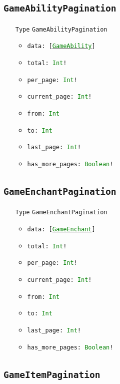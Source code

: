 \documentclass[10pt, a4paper]{memoir}
\numberwithin{equation}{section}
\theoremstyle{plain}
\theoremstyle{defp}
\theoremstyle{dotless}
\theoremstyle{definition}
\theoremstyle{dotless}
\theoremstyle{dotless}
\theoremstyle{defp}
\theoremstyle{defp}
\theoremstyle{be}          %
\theoremstyle{defp}
\newcommand\ttt[1]{\texttt{#1}}
\newcommand\type[1]{\ttt{\textcolor{green}{#1}}}
\begin{document}
\subsection{\ttt{GameAbilityPagination}}\label{sec:gameabilitypagination}

\begin{itemize}[noitemsep,topsep=1pt]
\item[\ttt{Type}] \ttt{GameAbilityPagination}
\begin{itemize}[itemsep=1pt,topsep=1pt]
\item \ttt{data: [\hyperref[sec:GameAbility]{\type{GameAbility}}]}
\item \ttt{total: \type{Int}!}
\item \ttt{per\_page: \type{Int}!}
\item \ttt{current\_page: \type{Int}!}
\item \ttt{from: \type{Int}}
\item \ttt{to: \type{Int}}
\item \ttt{last\_page: \type{Int}!}
\item \ttt{has\_more\_pages: \type{Boolean}!}
\end{itemize}
\end{itemize}

\subsection{\ttt{GameEnchantPagination}}\label{sec:gameenchantpagination}

\begin{itemize}[noitemsep,topsep=1pt]
\item[\ttt{Type}] \ttt{GameEnchantPagination}
\begin{itemize}[itemsep=1pt,topsep=1pt]
\item \ttt{data: [\hyperref[sec:GameEnchant]{\type{GameEnchant}}]}
\item \ttt{total: \type{Int}!}
\item \ttt{per\_page: \type{Int}!}
\item \ttt{current\_page: \type{Int}!}
\item \ttt{from: \type{Int}}
\item \ttt{to: \type{Int}}
\item \ttt{last\_page: \type{Int}!}
\item \ttt{has\_more\_pages: \type{Boolean}!}
\end{itemize}
\end{itemize}

\subsection{\ttt{GameItemPagination}}\label{sec:gameitempagination}
\end{document}
